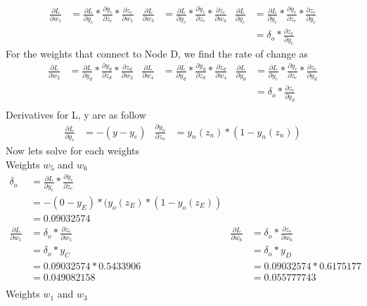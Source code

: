 \documentclass[12pt,english]{article}
\begin{document}
\begin{align*}
\frac{\partial L}{\partial w_1} &=\frac{\partial L}{\partial y_c} * \frac{\partial y_c}{\partial z_c} * \frac{\partial z_c}{\partial w_1} &
\frac{\partial L}{\partial w_3} &=\frac{\partial L}{\partial y_c} * \frac{\partial y_c}{\partial z_c} * \frac{\partial z_c}{\partial w_3} &
 \frac{\partial L}{\partial y_c}  &= \frac{\partial L}{\partial y_e} * \frac{\partial y_e}{\partial z_e} * \frac{\partial z_e}{\partial y_c}\\
& &&&   &= \delta_o * \frac{\partial z_e}{\partial y_c} 
\end{align*}
 For the weights that connect to Node D, we find the rate of change as
\begin{align*}
\frac{\partial L}{\partial w_2} &=\frac{\partial L}{\partial y_d} * \frac{\partial y_d}{\partial z_d} * \frac{\partial z_d}{\partial w_2} &
\frac{\partial L}{\partial w_4} &=\frac{\partial L}{\partial y_d} * \frac{\partial y_d}{\partial z_d} * \frac{\partial z_d}{\partial w_4} &
 \frac{\partial L}{\partial y_d}  &= \frac{\partial L}{\partial y_e} * \frac{\partial y_e}{\partial z_e} * \frac{\partial z_e}{\partial y_d} \\
& &&&  &= \delta_o * \frac{\partial z_e}{\partial y_d} \\
\end{align*}
Derivatives for L, y  are as follow
\begin{align*}
\frac{\partial L}{\partial y_e} &= -(y -y_e) &
 \frac{\partial y_n}{\partial z_n}&= y_n(z_n) * (1 - y_n(z_n))
\end{align*}
Now lets solve for each weights\\
Weights $w_5$ and $w_6$
\begin{align*}
\delta_o &= \frac{\partial L}{\partial y_e} * \frac{\partial y_e}{\partial z_e}\\
 &=-(0 - y_E) * (y_o(z_E) *(1 -y_o(z_E))\\
 &=0.09032574\\
\frac{\partial L}{\partial w_5} &=\delta_o* \frac{\partial z_e}{\partial w_5} &
\frac{\partial L}{\partial w_6} &=\delta_o * \frac{\partial z_e}{\partial w_6} \\
&=\delta_o * y_C &
&=\delta_o * y_D \\
&=0.09032574 * 0.5433906 &
&=0.09032574 * 0.6175177 \\
&=0.049082158&
&=0.055777743\\
\end{align*}
Weights $w_1$ and $w_3$
\end{document}
